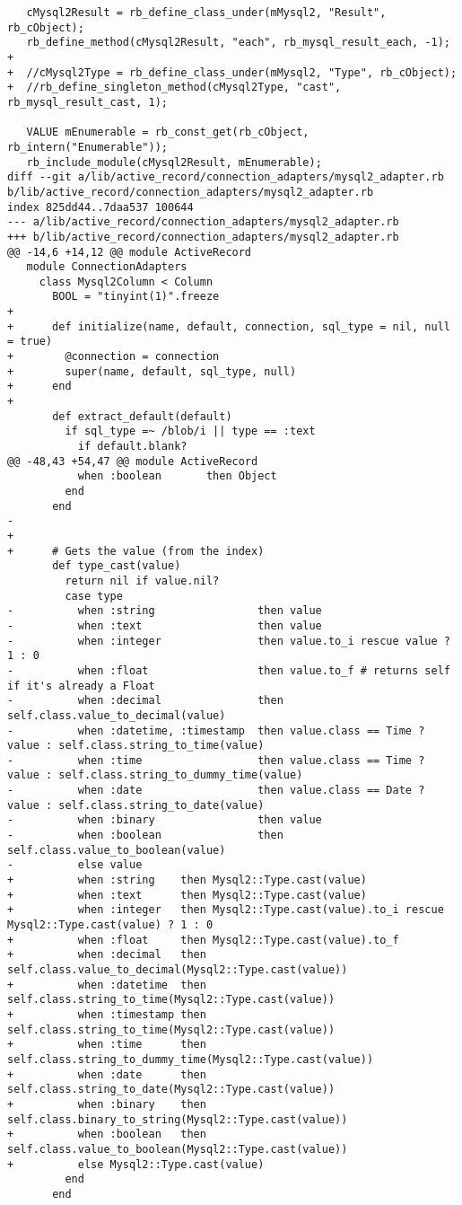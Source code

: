 \begin{lstlisting}
   cMysql2Result = rb_define_class_under(mMysql2, "Result", rb_cObject);
   rb_define_method(cMysql2Result, "each", rb_mysql_result_each, -1);
+  
+  //cMysql2Type = rb_define_class_under(mMysql2, "Type", rb_cObject);
+  //rb_define_singleton_method(cMysql2Type, "cast", rb_mysql_result_cast, 1);
 
   VALUE mEnumerable = rb_const_get(rb_cObject, rb_intern("Enumerable"));
   rb_include_module(cMysql2Result, mEnumerable);
diff --git a/lib/active_record/connection_adapters/mysql2_adapter.rb b/lib/active_record/connection_adapters/mysql2_adapter.rb
index 825dd44..7daa537 100644
--- a/lib/active_record/connection_adapters/mysql2_adapter.rb
+++ b/lib/active_record/connection_adapters/mysql2_adapter.rb
@@ -14,6 +14,12 @@ module ActiveRecord
   module ConnectionAdapters
     class Mysql2Column < Column
       BOOL = "tinyint(1)".freeze
+      
+      def initialize(name, default, connection, sql_type = nil, null = true)
+        @connection = connection
+        super(name, default, sql_type, null)
+      end
+      
       def extract_default(default)
         if sql_type =~ /blob/i || type == :text
           if default.blank?
@@ -48,43 +54,47 @@ module ActiveRecord
           when :boolean       then Object
         end
       end
-
+      
+      # Gets the value (from the index)
       def type_cast(value)
         return nil if value.nil?
         case type
-          when :string                then value
-          when :text                  then value
-          when :integer               then value.to_i rescue value ? 1 : 0
-          when :float                 then value.to_f # returns self if it's already a Float
-          when :decimal               then self.class.value_to_decimal(value)
-          when :datetime, :timestamp  then value.class == Time ? value : self.class.string_to_time(value)
-          when :time                  then value.class == Time ? value : self.class.string_to_dummy_time(value)
-          when :date                  then value.class == Date ? value : self.class.string_to_date(value)
-          when :binary                then value
-          when :boolean               then self.class.value_to_boolean(value)
-          else value
+          when :string    then Mysql2::Type.cast(value)
+          when :text      then Mysql2::Type.cast(value)
+          when :integer   then Mysql2::Type.cast(value).to_i rescue Mysql2::Type.cast(value) ? 1 : 0
+          when :float     then Mysql2::Type.cast(value).to_f
+          when :decimal   then self.class.value_to_decimal(Mysql2::Type.cast(value))
+          when :datetime  then self.class.string_to_time(Mysql2::Type.cast(value))
+          when :timestamp then self.class.string_to_time(Mysql2::Type.cast(value))
+          when :time      then self.class.string_to_dummy_time(Mysql2::Type.cast(value))
+          when :date      then self.class.string_to_date(Mysql2::Type.cast(value))
+          when :binary    then self.class.binary_to_string(Mysql2::Type.cast(value))
+          when :boolean   then self.class.value_to_boolean(Mysql2::Type.cast(value))
+          else Mysql2::Type.cast(value)
         end
       end
 

\end{lstlisting}
